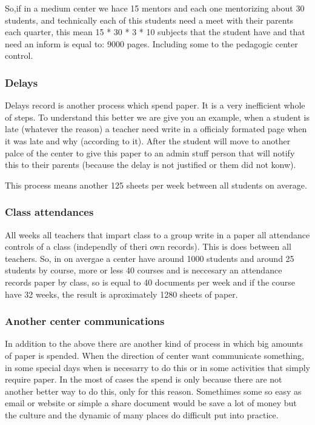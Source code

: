 So,if in a medium center we hace 15 mentors and each one mentorizing about
30 students, and technically each of this students need a meet with their
parents each quarter, this mean 15 * 30 * 3 * 10 subjects that the student have
 and that need an inform is equal to: 9000 pages.
Including some to the pedagogic center control.


\subsubsection{Delays}

Delays record is another process which spend paper. It is a very inefficient
whole of steps. To understand this better we are give you an example, when a
student is late (whatever the reason) a teacher need write in a officialy formated
page when it was late and why (according to it). After the student will move to
another palce of the center to give this paper to an admin stuff person that will
notify this to their parents (because the delay is not justified or them did not
konw).

This process means another 125 sheets per week between all students on average.

\subsubsection{Class attendances}

All weeks all teachers that impart class to a group write in a paper
all attendance controls of a class (independly of theri own records). This
is does between all teachers. So, in on avergae a center have around 1000 students
and around 25 students by course, more or less 40 courses and is neccesary
an attendance records paper by class, so is equal to 40 documents per week and
if the course have 32 weeks, the result is aproximately 1280 sheets of paper.



\subsubsection{Another center communications}

In addition to the above there are another kind of process in which big amounts
of paper is spended. When the direction of center want communicate something,
in some special days when is necesarry to do this or in some activities that
simply require paper.
In the most of cases the spend is only because there are not another better way
to do this, only for this reason. Somethimes some so easy as email or website or
simple a share document would be save a lot of money but the culture and the
dynamic of many places do difficult put into practice.


